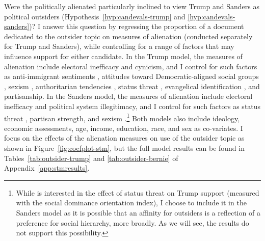 \documentclass[12pt]{article}
\begin{document}
Were the politically alienated particularly inclined to view Trump and Sanders as political outsiders (Hypothesis~\ref{hyp:candevals-trump} and \ref{hyp:candevals-sanders})? I answer this question by regressing the proportion of a document dedicated to the outsider topic on measures of alienation (conducted separately for Trump and Sanders), while controlling for a range of factors that may influence support for either candidate. In the Trump model, the measures of alienation include electoral inefficacy and cynicism, and I control for such factors as anti-immigrant sentiments \parencite{sides2018identity,hooghe2018explaining}, attitudes toward Democratic-aligned social groups \parencite{mason2021activating,hopkins2021activation}, sexism \parencite{valentino2018mobilizing}, authoritarian tendencies \parencite{knuckey2020authoritarianism}, status threat \parencite{mutz2018status}, evangelical identification \parencite{margolis2020wants}, and partisanship. In the Sanders model, the measures of alienation include electoral inefficacy and political system illegitimacy, and I control for such factors as status threat \parencite{mutz2018status}, partisan strength, and sexism \parencite{sides2018identity}.\footnote{While \textcite{mutz2018status} is interested in the effect of status threat on Trump support (measured with the social dominance orientation index), I choose to include it in the Sanders model as it is possible that an affinity for outsiders is a reflection of a preference for social hierarchy, more broadly. As we will see, the results do not support this possibility.} Both models also include ideology, economic assessments, age, income, education, race, and sex as co-variates. I focus on the effects of the alienation measures on use of the outsider topic as shown in Figure~\ref{fig:coefplot-stm}, but the full model results can be found in Tables~\ref{tab:outsider-trump} and \ref{tab:outsider-bernie} of Appendix~\ref{app:stmresults}. 
\end{document}
